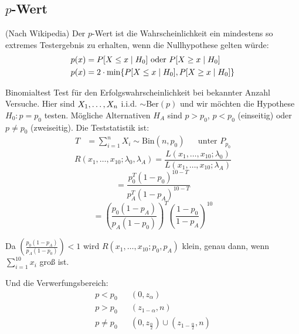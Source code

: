 \subsection{$p$-Wert}
(Nach Wikipedia) Der $p$-Wert ist die Wahrscheinlichkeit ein mindestens
so extremes Testergebnis zu erhalten, wenn die Nullhypothese gelten würde:
\begin{align*}
  p (x) & = P[X \leq x \; | \; H_0] \text{   oder   } P[X \geq x \; | \; H_0]   \\
  p (x) & = 2 \cdot \min \{ P[X \leq x \; | \; H_0], P[X \geq x \; | \; H_0] \}
\end{align*}
\begin{definition}{Binomialtest}
  \color{red}Test für den Erfolgswahrscheinlichkeit bei bekannter Anzahl Versuche. \color{black} Hier sind
  $X_1, \dots, X_n$ i.i.d. $\sim \text{Ber}(p)$ und wir möchten die
  Hypothese $H_0 : p = p_0$ testen. Mögliche Alternativen $H_A$ sind $p > p_0$, $p < p_0$ (einseitig) oder $p \neq p_0$ (zweiseitig). Die Teststatistik ist:
  \begin{align*}
    T & = \sum_{i=1}^{n} X_i \sim \text{Bin}(n, p_0) &  & \text{unter } P_{p_0}
  \end{align*}
  \[
    R(x_1, \ldots, x_{10}; \lambda_0, \lambda_A) = \frac{L(x_1, \ldots, x_{10}; \lambda_0)}{L(x_1, \ldots, x_{10}; \lambda_A)}
  \]
  \[
    = \frac{p_0^T (1 - p_0)^{10-T}}{p_A^T (1 - p_A)^{10-T}}
  \]
  \[
    = \left( \frac{p_0(1 - p_A)}{p_A(1 - p_0)} \right)^T \left( \frac{1 - p_0}{1 - p_A} \right)^{10}
  \]

  Da $\left( \frac{p_0(1-p_A)}{p_A(1-p_0)} \right) < 1$ wird $R(x_1, \ldots, x_{10}; p_0, p_A)$ klein, genau dann, wenn $\sum_{i=1}^{10} x_i$ groß ist.

  Und die Verwerfungsbereich:
  \begin{align*}
    p < p_0    &  & (0, z_\alpha)                                                 \\
    p > p_0    &  & (z_{1 - \alpha}, n)                                           \\
    p \neq p_0 &  & (0, z_{\frac{\alpha}{2}}) \cup  (z_{1 - \frac{\alpha}{2}}, n)
  \end{align*}



\end{definition}
